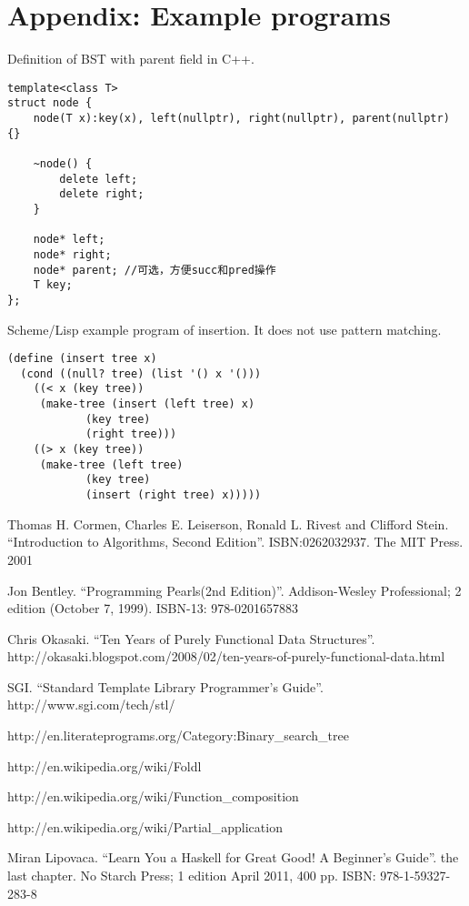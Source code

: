 \documentclass[b5paper]{article}
\begin{document}
\section{Appendix: Example programs}

Definition of BST with parent field in C++.

\lstset{language=C++, frame=single}
\begin{lstlisting}
template<class T>
struct node {
    node(T x):key(x), left(nullptr), right(nullptr), parent(nullptr) {}

    ~node() {
        delete left;
        delete right;
    }

    node* left;
    node* right;
    node* parent; //可选，方便succ和pred操作
    T key;
};
\end{lstlisting}

Scheme/Lisp example program of insertion. It does not use pattern matching.

\lstset{language=lisp}
\begin{lstlisting}
(define (insert tree x)
  (cond ((null? tree) (list '() x '()))
	((< x (key tree))
	 (make-tree (insert (left tree) x)
		    (key tree)
		    (right tree)))
	((> x (key tree))
	 (make-tree (left tree)
		    (key tree)
		    (insert (right tree) x)))))
\end{lstlisting}

\begin{thebibliography}{99}

Thomas H. Cormen, Charles E. Leiserson, Ronald L. Rivest and Clifford Stein.
``Introduction to Algorithms, Second Edition''. ISBN:0262032937. The MIT Press. 2001

Jon Bentley. ``Programming Pearls(2nd Edition)''. Addison-Wesley Professional; 2 edition (October 7, 1999). ISBN-13: 978-0201657883

Chris Okasaki. ``Ten Years of Purely Functional Data Structures''. http://okasaki.blogspot.com/2008/02/ten-years-of-purely-functional-data.html

SGI. ``Standard Template Library Programmer's Guide''. http://www.sgi.com/tech/stl/

http://en.literateprograms.org/Category:Binary\_search\_tree

http://en.wikipedia.org/wiki/Foldl

http://en.wikipedia.org/wiki/Function\_composition

http://en.wikipedia.org/wiki/Partial\_application

Miran Lipovaca. ``Learn You a Haskell for Great Good! A Beginner's Guide''. the last chapter. No Starch Press; 1 edition April 2011, 400 pp. ISBN: 978-1-59327-283-8

\end{thebibliography}

\ifx\wholebook\relax\else
\end{document}
